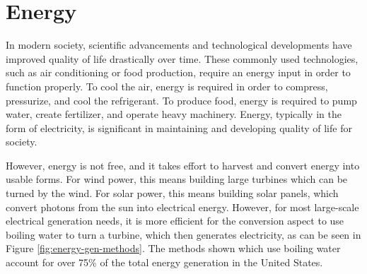 
\renewcommand*\descriptionlabel[1]{\hspace\leftmargin$#1$}
\setcounter{tocdepth}{5}
\setcounter{secnumdepth}{5}
\newcommand{\minus}{\scalebox{0.65}[1.0]{$-$}}

\section{Energy}

In modern society, scientific advancements and technological developments have improved quality of life drastically over time.
These commonly used technologies, such as air conditioning or food production, require an energy input in order to function properly.
To cool the air, energy is required in order to compress, pressurize, and cool the refrigerant. To produce food, energy is required to pump water, create fertilizer, and operate heavy machinery.
Energy, typically in the form of electricity, is significant in maintaining and developing quality of life for society.

However, energy is not free, and it takes effort to harvest and convert energy into usable forms. For wind power, this means building large turbines which can be turned by the wind. For solar power, this means building solar panels, which convert photons from the sun into electrical energy. However, for most large-scale electrical generation needs, it is more efficient for the conversion aspect to use boiling water to turn a turbine, which then generates electricity, as can be seen in Figure \ref{fig:energy-gen-methods}. The methods shown which use boiling water account for over 75\% of the total energy generation in the United States.

